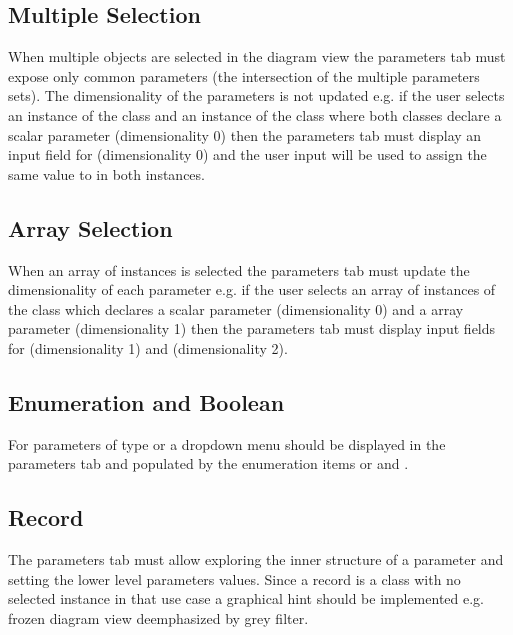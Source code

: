 \documentclass[letterpaper,10pt, openany,english]{sphinxmanual}
\begin{document}
\subsection{Multiple Selection}
\label{\detokenize{requirements:multiple-selection}}
When multiple objects are selected in the diagram view the parameters tab must expose only common parameters (the intersection of the multiple parameters sets). The dimensionality of the parameters is not updated e.g. if the user selects an instance  of the class  and an instance  of the class  where both classes declare  a  scalar parameter  (dimensionality 0) then the parameters tab must display an input field for  (dimensionality 0) and the user input will be used to assign the same value to  in both instances.


\subsection{Array Selection}
\label{\detokenize{requirements:array-selection}}
When an array of instances is selected the parameters tab must update the dimensionality of each parameter e.g. if the user selects an array  of instances of the class  which declares a  scalar parameter  (dimensionality 0) and a  array parameter  (dimensionality 1) then the parameters tab must display input fields for  (dimensionality 1) and  (dimensionality 2).


\subsection{Enumeration and Boolean}
\label{\detokenize{requirements:enumeration-and-boolean}}
For parameters of type  or  a dropdown menu should be displayed in the parameters tab and populated by the enumeration items or  and .


\subsection{Record}
\label{\detokenize{requirements:record}}
The parameters tab must allow exploring the inner structure of a parameter  and setting the lower level parameters values. Since a record is a class with no selected instance in that use case a graphical hint should be implemented e.g. frozen diagram view deemphasized by grey filter.
\end{document}
